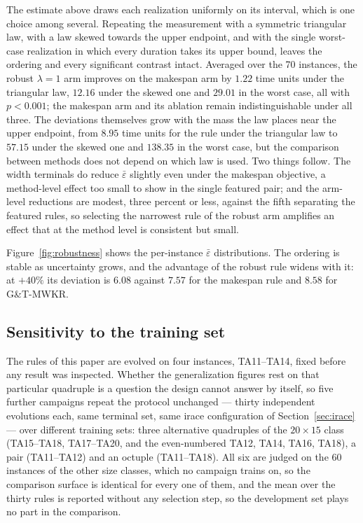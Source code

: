 \documentclass[review,authoryear,11pt]{elsarticle}
\newcommand{\rev}[1]{\textcolor{revcolor}{#1}}
\begin{document}
\rev{The estimate above draws each realization uniformly on its
interval, which is one choice among several. Repeating the measurement
with a symmetric triangular law, with a law skewed towards the upper
endpoint, and with the single worst-case realization in which every
duration takes its upper bound, leaves the ordering and every
significant contrast intact. Averaged over the 70 instances, the robust
$\lambda{=}1$ arm improves on the makespan arm by $1.22$ time units
under the triangular law, $12.16$ under the skewed one and $29.01$ in
the worst case, all with $p<0.001$; the makespan arm and its ablation
remain indistinguishable under all three. The deviations themselves
grow with the mass the law places near the upper endpoint, from $8.95$
time units for the rule under the triangular law to $57.15$ under the
skewed one and $138.35$ in the worst case, but the comparison between
methods does not depend on which law is used.}
Two things follow. The width terminals do reduce
$\bar\varepsilon$ slightly even under the makespan objective, a
method-level effect too small to show in the single featured pair; and
the arm-level reductions are modest, three percent or less, against the
fifth separating the featured rules, so selecting the narrowest rule of
the robust arm amplifies an effect that at the method level is
consistent but small.

Figure~\ref{fig:robustness} shows the per-instance $\bar\varepsilon$
distributions. The ordering is stable as uncertainty grows, and the
advantage of the robust rule widens with it: at $+40\%$ its deviation is
$6.08$ against $7.57$ for the makespan rule and $8.58$ for G\&T-MWKR.





\subsection{Sensitivity to the training set}
\label{sec:trainset}

\rev{The rules of this paper are evolved on four instances, TA11--TA14,
fixed before any result was inspected. Whether the generalization
figures rest on that particular quadruple is a question the design
cannot answer by itself, so five further campaigns repeat the protocol
unchanged --- thirty independent evolutions each, same terminal set,
same irace configuration of Section~\ref{sec:irace} --- over different
training sets: three alternative quadruples of the $20{\times}15$ class
(TA15--TA18, TA17--TA20, and the even-numbered TA12, TA14, TA16, TA18),
a pair (TA11--TA12) and an octuple (TA11--TA18). All six are judged on
the 60 instances of the other size classes, which no campaign trains on,
so the comparison surface is identical for every one of them, and the
mean over the thirty rules is reported without any selection step, so
the development set plays no part in the comparison.}
\end{document}
